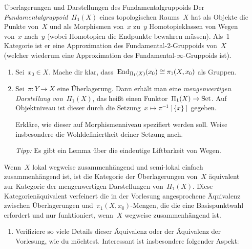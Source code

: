 \documentclass{uebblatt}
\begin{document}
\begin{aufgabe}{Überlagerungen und Darstellungen des Fundamentalgruppoids}
%
Der \emph{Fundamentalgruppoid}~$\Pi_1(X)$ eines topologischen Raums~$X$ hat als
Objekte die Punkte von~$X$ und als Morphismen von~$x$ zu~$y$ Homotopieklassen
von Wegen von~$x$ nach~$y$ (wobei Homotopien die Endpunkte bewahren müssen).
Als~1-Kategorie ist er eine Approximation des Fundamental-2-Gruppoids von~$X$
(welcher wiederum eine Approximation des Fundamental-$\infty$-Gruppoids ist).
\begin{enumerate}
\item Sei~$x_0 \in X$. Mache dir klar, dass~$\mathrm{End}_{\Pi_1(X)}(x_0) \cong
\pi_1(X,x_0)$ als Gruppen.
\item Sei~$\pi : Y \to X$ eine Überlagerung. Dann erhält man eine
\emph{mengenwertigen Darstellung von~$\Pi_1(X)$}, das heißt einen
Funktor~$\Pi_1(X) \to \mathrm{Set}$. Auf Objektniveau ist dieser durch die Setzung~$x
\mapsto \pi^{-1}[\{x\}]$ gegeben.

Erkläre, wie dieser auf Morphismenniveau spezifiert werden soll. Weise
insbesondere die Wohldefiniertheit deiner Setzung nach.

\emph{Tipp:} Es gibt ein Lemma über die eindeutige Liftbarkeit von Wegen.
\end{enumerate}
Wenn~$X$ lokal wegweise zusammenhängend und semi-lokal einfach
zusammenhängend ist, ist die Kategorie der Überlagerungen von~$X$
äquivalent zur Kategorie der mengenwertigen Darstellungen
von~$\Pi_1(X)$. Diese Kategorienäquivalent verfeinert die in der Vorlesung
angesprochene Äquivalenz zwischen Überlagerungen und~$\pi_1(X,x_0)$-Mengen, die
die eine Basispunktwahl erfordert und nur funktioniert, wenn~$X$ wegweise
zusammenhängend ist.
\begin{enumerate}
\addtocounter{enumi}{2}
\item Verifiziere so viele Details dieser Äquivalenz oder der Äquivalenz der
Vorlesung, wie du möchtest. Interessant ist insbesondere folgender Aspekt:


\end{enumerate}
\end{aufgabe}
\end{document}
